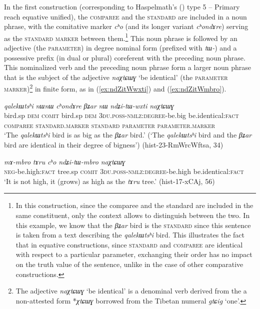 \documentclass[oneside,a4paper,11pt]{article}
\newcommand{\ipa}[1]{{\phon\textit{#1}}}
\newcommand{\forme}[2]{\ipa{#1} `#2'}
\begin{document}
In the first construction (corresponding to Haspelmath's (\citeyear{haspelmath17equative}) type 5 -- Primary reach equative unified), the \textsc{comparee} and the \textsc{standard} are included in a noun phrase, with the comitative marker \ipa{cʰo} (and its longer variant \ipa{cʰondɤre}) serving as the \textsc{standard marker} between them.\footnote{In this construction, since the comparee and the standard are included in the same constituent, only the context allows to distinguish between the two. In this example, we know that the \ipa{βʑar} bird is the \textsc{standard} since this sentence is taken from a text describing the \ipa{qalekɯtsʰi} bird. This illustrates the fact that in equative constructions, since \textsc{standard} and \textsc{comparee} are identical with respect to a particular parameter, exchanging their order has no impact on the truth value of the sentence, unlike in the case of other comparative constructions.} This noun phrase is followed by an adjective (the \textsc{parameter}) in degree nominal form (prefixed with \ipa{tɯ-}) and a possessive prefix (in dual or plural) coreferent with the preceding noun phrase. This nominalized verb and the preceding noun phrase form a larger noun phrase that is the subject of the adjective \forme{naχtɕɯɣ}{be identical} (the \textsc{parameter marker})\footnote{The adjective \forme{naχtɕɯɣ}{be identical} is a denominal verb derived from the a non-attested form *\ipa{χtɕɯɣ} borrowed from the Tibetan numeral \forme{gtɕig}{one}. } in finite form, as in (\ref{ex:ndZitWwxti}) and (\ref{ex:ndZitWmbro}).

\begin{exe}
\ex \label{ex:ndZitWwxti}
\glll
\ipa{qalekɯtsʰi} 	\ipa{nɯnɯ} 	\ipa{cʰondɤre} 	\ipa{βʑar} 	\ipa{nɯ} 	\ipa{ndʑi-tɯ-wxti} 	\ipa{naχtɕɯɣ} \\
bird.sp \textsc{dem} \textsc{comit} bird.sp \textsc{dem} \textsc{3du.poss-nmlz:degree}-be.big be.identical:\textsc{fact} \\
{\textsc{comparee}} { } \textsc{standard.marker} {\textsc{standard}} { } \textsc{parameter} \textsc{parameter.marker} \\
\glt `The \ipa{qalekɯtsʰi} bird is as big as the \ipa{βʑar} bird.' (`The \ipa{qalekɯtsʰi} bird and the \ipa{βʑar} bird are identical in their degree of bigness')  (hist-23-RmWrcWftsa, 34)
\end{exe}
 

\begin{exe}
\ex \label{ex:ndZitWmbro}
\gll 
\ipa{mɤ-mbro} 	\ipa{tɤru} 	\ipa{cʰo} 	\ipa{ndʑi-tɯ-mbro} 	\ipa{naχtɕɯɣ} \\
\textsc{neg}-be.high:\textsc{fact} tree.sp \textsc{comit} \textsc{3du.poss-nmlz:degree}-be.high be.identical:\textsc{fact} \\
\glt `It is not high, it (grows) as high as the \ipa{tɤru} tree.' (hist-17-xCAj, 56)
\end{exe}
\end{document}
